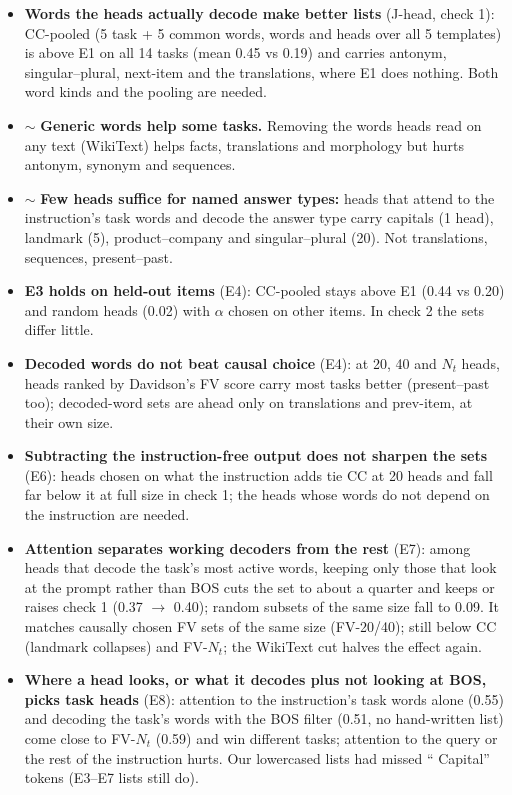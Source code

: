 \documentclass[10pt,a4paper]{article}
\newcommand{\yes}{\textcolor{green!45!black}{\ding{51}}}
\newcommand{\no}{\textcolor{red!70!black}{\ding{55}}}
\newcommand{\mixed}{\textcolor{orange!80!black}{$\sim$}}
\begin{document}
\begin{itemize}
\item \yes{} \textbf{Words the heads actually decode make better lists} (J-head, check 1): CC-pooled (5 task + 5 common words, words and heads over all 5 templates) is above E1 on all 14 tasks (mean 0.45 vs 0.19) and carries antonym, singular--plural, next-item and the translations, where E1 does nothing. Both word kinds and the pooling are needed.
\item \mixed{} \textbf{Generic words help some tasks.} Removing the words heads read on any text (WikiText) helps facts, translations and morphology but hurts antonym, synonym and sequences.
\item \mixed{} \textbf{Few heads suffice for named answer types:} heads that attend to the instruction's task words and decode the answer type carry capitals (1 head), landmark (5), product--company and singular--plural (20). Not translations, sequences, present--past.
\item \yes{} \textbf{E3 holds on held-out items} (E4): CC-pooled stays above E1 (0.44 vs 0.20) and random heads (0.02) with $\alpha$ chosen on other items. In check 2 the sets differ little.
\item \no{} \textbf{Decoded words do not beat causal choice} (E4): at 20, 40 and $N_t$ heads, heads ranked by Davidson's FV score carry most tasks better (present--past too); decoded-word sets are ahead only on translations and prev-item, at their own size.
\item \no{} \textbf{Subtracting the instruction-free output does not sharpen the sets} (E6): heads chosen on what the instruction adds tie CC at 20 heads and fall far below it at full size in check 1; the heads whose words do not depend on the instruction are needed.
\item \yes{} \textbf{Attention separates working decoders from the rest} (E7): among heads that decode the task's most active words, keeping only those that look at the prompt rather than BOS cuts the set to about a quarter and keeps or raises check 1 (0.37 $\to$ 0.40); random subsets of the same size fall to 0.09. It matches causally chosen FV sets of the same size (FV-20/40); still below CC (landmark collapses) and FV-$N_t$; the WikiText cut halves the effect again.
\item \yes{} \textbf{Where a head looks, or what it decodes plus not looking at BOS, picks task heads} (E8): attention to the instruction's task words alone (0.55) and decoding the task's words with the BOS filter (0.51, no hand-written list) come close to FV-$N_t$ (0.59) and win different tasks; attention to the query or the rest of the instruction hurts. Our lowercased lists had missed `` Capital'' tokens (E3--E7 lists still do).

\end{itemize}
\end{document}
